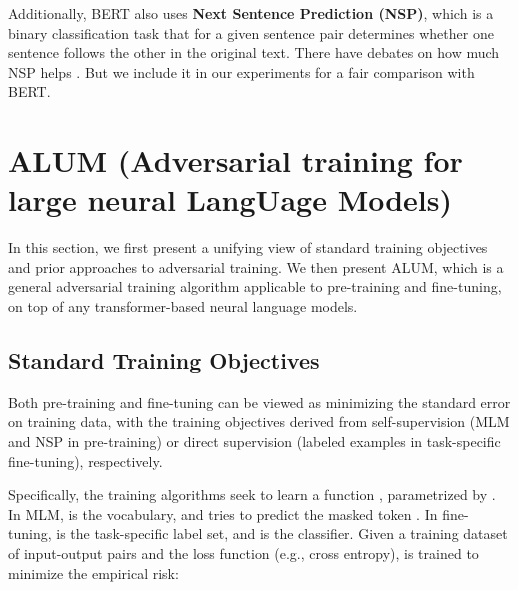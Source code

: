 \documentclass[11pt,a4paper]{article}
\newcommand\DNAME{ALUM}
\newcommand{\eat}[1]{\ignorespaces}
\begin{document}
\eat{
\noindent \textbf{Masked language modeling} is a cloze task \cite{taylor1953cloze}. During the training, we randomly select a bunch of tokens and replace them with a special token (e.g. [MASK]). The goal is that let the model to restore its original tokens which were replaced by [MASK]. Thus the training objective is a cross-entropy loss between the true masked tokens and predicting tokens. Originally, for example, BERT and RoBERTa select 15\% of the input tokens for possible replacement. Among them, 80\% of tokens are substituted by [MASK], 10\% are left unchanged and 10\% are replaced by a token which is randomly selected in vocabulary. In our experiments, we progressively increase the mask rate from 5\% to 25\% by 5\% in every 20\% of each training phrase, and find that it stabilizes training meanwhile keep the total masked tokens the same as the original training.
}

Additionally, BERT also uses \textbf{Next Sentence Prediction (NSP)}, which is a binary classification task that for a given sentence pair determines whether one sentence follows the other in the original text. There have debates on how much NSP helps \cite{liu2019roberta}. But we include it in our experiments for a fair comparison with BERT. \section{{\DNAME} (\textbf{A}dversarial training for large neural \textbf{L}ang\textbf{U}age \textbf{M}odels)}
\label{sec:alum}

In this section, 
we first present a unifying view of standard training objectives and prior approaches to adversarial training. 
We then present {\DNAME}, which is a general adversarial training algorithm applicable to pre-training and fine-tuning, on top of any transformer-based neural language models.

\subsection{Standard Training Objectives}
\label{subsec:bg}
Both pre-training and fine-tuning can be viewed as minimizing the standard error on training data, with the training objectives derived from self-supervision (MLM and NSP in pre-training) or direct supervision (labeled examples in task-specific fine-tuning), respectively.

Specifically, the training algorithms seek to learn a function , parametrized by . In MLM,  is the vocabulary, and  tries to predict the masked token . 
In fine-tuning,  is the task-specific label set, and  is the classifier.
Given a training dataset  of input-output pairs  and the loss function  (e.g., cross entropy),
 is trained to minimize the empirical risk:
 
\end{document}
